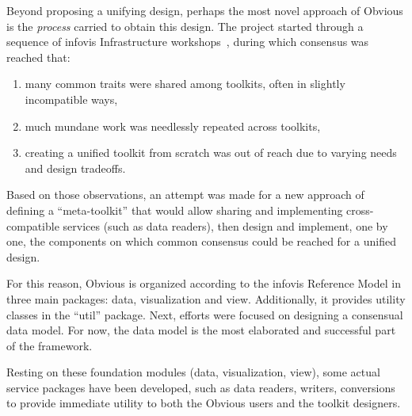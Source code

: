 Beyond proposing a unifying design, perhaps the most novel approach of
Obvious is the \emph{process} carried to obtain this design.  The
project started through a sequence of infovis Infrastructure
workshops~\cite{visinfrastructure1, visinfrastructure2,
vismaster2008}, during which consensus was reached that:

\begin{enumerate}[noitemsep]
\item many common traits were shared among toolkits, often in slightly
  incompatible ways,
\item much mundane work was needlessly repeated across toolkits,
\item creating a unified toolkit from scratch was out of reach due to
  varying needs and design tradeoffs.
\end{enumerate}

Based on those observations, an attempt was made for a new approach of
defining a ``meta-toolkit'' that would allow sharing and implementing
cross-compatible services (such as data readers), then design and
implement, one by one, the components on which common consensus could
be reached for a unified design.

For this reason, Obvious is organized according to the infovis
Reference Model in three main packages: data, visualization and
view. Additionally, it provides utility classes in the ``util''
package.  Next, efforts were focused on designing a consensual data
model. For now, the data model is the most elaborated and successful
part of the framework.

Resting on these foundation modules (data, visualization, view), some
actual service packages have been developed, such as data readers,
writers, conversions to provide immediate utility to both the Obvious
users and the toolkit designers.

